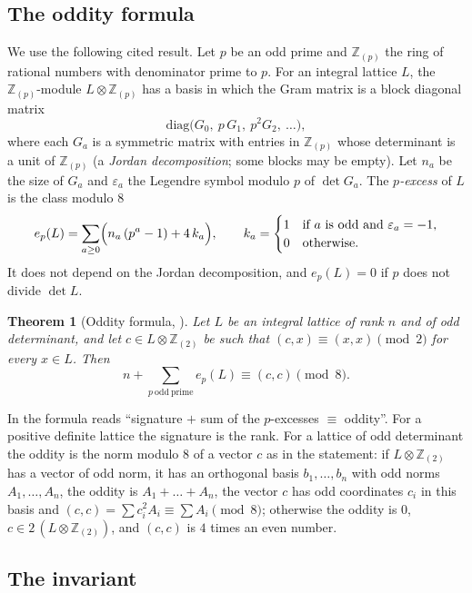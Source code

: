 \documentclass[11pt,a4paper]{article}
\newtheorem{theorem}{Theorem}[section]
\theoremstyle{definition}
\theoremstyle{remark}
\newcommand{\ZZ}{\mathbb{Z}}
\begin{document}
\subsection{The oddity formula}
We use the following cited result. Let $p$ be an odd prime and $\ZZ_{(p)}$ the ring of rational numbers with
denominator prime to $p$. For an integral lattice $L$, the $\ZZ_{(p)}$-module $L\otimes\ZZ_{(p)}$ has a basis in which
the Gram matrix is a block diagonal matrix
\[
\mathrm{diag}\bigl(G_0,\ p\,G_1,\ p^2G_2,\ \dots\bigr),
\]
where each $G_a$ is a symmetric matrix with entries in $\ZZ_{(p)}$ whose determinant is a unit of $\ZZ_{(p)}$ (a
\emph{Jordan decomposition}; some blocks may be empty). Let $n_a$ be the size of $G_a$ and $\varepsilon_a$ the
Legendre symbol modulo $p$ of $\det G_a$. The \emph{$p$-excess} of $L$ is the class modulo $8$
\[
e_p(L)=\sum_{a\ge0}\Bigl(n_a\,(p^a-1)+4\,k_a\Bigr),\qquad k_a=\begin{cases}1&\text{if $a$ is odd and
$\varepsilon_a=-1$,}\\0&\text{otherwise.}\end{cases}
\]
It does not depend on the Jordan decomposition, and $e_p(L)=0$ if $p$ does not divide $\det L$.

\begin{theorem}[Oddity formula, {\cite[Chapter~15]{CS}}]\label{thm:oddity}
Let $L$ be an integral lattice of rank $n$ and of odd determinant, and let $c\in L\otimes\ZZ_{(2)}$ be such that
$(c,x)\equiv(x,x)\pmod2$ for every $x\in L$. Then
\[
n+\sum_{p\ \mathrm{odd\ prime}}e_p(L)\equiv(c,c)\pmod8 .
\]
\end{theorem}

In \cite{CS} the formula reads ``signature $+$ sum of the $p$-excesses $\equiv$ oddity''. For a positive definite
lattice the signature is the rank. For a lattice of odd determinant the oddity is the norm modulo $8$ of a vector $c$
as in the statement: if $L\otimes\ZZ_{(2)}$ has a vector of odd norm, it has an orthogonal basis $b_1,\dots,b_n$ with
odd norms $A_1,\dots,A_n$, the oddity is $A_1+\dots+A_n$, the vector $c$ has odd coordinates $c_i$ in this basis and
$(c,c)=\sum c_i^2A_i\equiv\sum A_i\pmod 8$; otherwise the oddity is $0$, $c\in2\,(L\otimes\ZZ_{(2)})$, and $(c,c)$ is
$4$ times an even number.

\subsection{The invariant}
\end{document}
